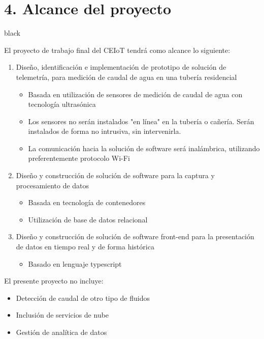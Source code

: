 \documentclass[
11pt, %
codirector, %
]{charter}
\begin{document}
\section{4. Alcance del proyecto}
\label{sec:alcance}

\begin{consigna}{black}

El proyecto de trabajo final del CEIoT tendrá como alcance lo siguiente:

\begin{enumerate}
\item Diseño, identificación e implementación de prototipo de solución de telemetría, para medición de caudal de agua en una tubería residencial
\begin{itemize}
	\item Basada en utilización de sensores de medición de caudal de agua con tecnología ultrasónica
	\item Los sensores no serán instalados "en línea" en la tubería o cañería. Serán instalados de forma no intrusiva, sin intervenirla.
	\item La comunicación hacia la solución de software será inalámbrica, utilizando preferentemente protocolo Wi-Fi
\end{itemize}

\item Diseño y construcción de solución de software para la captura y procesamiento de datos
\begin{itemize}
	\item Basada en tecnología de contenedores
	\item Utilización de base de datos relacional
\end{itemize}

\item Diseño y construcción de solución de software front-end para la presentación de datos en tiempo real y de forma histórica
\begin{itemize}
	\item Basado en lenguaje typescript
\end{itemize}

\end{enumerate}

El presente proyecto no incluye:

\begin{itemize}
	\item Detección de caudal de otro tipo de fluidos
	\item Inclusión de servicios de nube
	\item Gestión de analítica de datos
\end{itemize}


\end{consigna}
\end{document}
